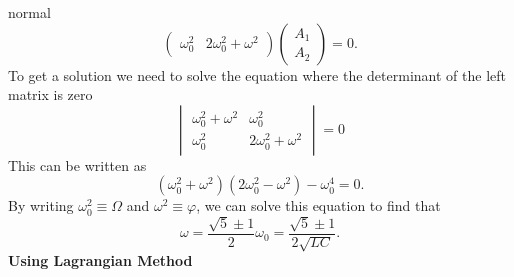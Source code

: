 \begin{solution}{normal}
\[\begin{pmatrix}
\omega_0^2 & 2\omega_0^2 + \omega^2 
\end{pmatrix}
\begin{pmatrix}
A_1 \\
A_2 
\end{pmatrix}
= 
0.\]
To get a solution we need to solve the equation where the determinant of the left matrix is zero
\[
\begin{vmatrix}
\omega_0^2 + \omega^2 & \omega_0^2 \\
\omega_0^2 & 2\omega_0^2 + \omega^2
\end{vmatrix}
=
0\]
This can be written as 
\[(\omega_0^2 + \omega^2)(2\omega_0^2 - \omega^2) - \omega_0^4 = 0.\]
By writing $\omega_0^2 \equiv \Omega$ and $\omega^2 \equiv \varphi$, we can solve this equation to find that 
\[\omega = \frac{\sqrt{5}\pm 1}{2}\omega_0 = \frac{\sqrt{5}\pm 1}{2\sqrt{LC}}.\]
\tcbline
\textbf{Using Lagrangian Method}
\\


\end{solution}
